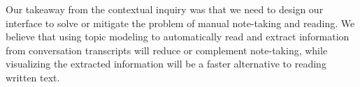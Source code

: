 Our takeaway from the contextual inquiry was that we need to design our interface to solve or mitigate the problem of manual note-taking and reading. We believe that using topic modeling to automatically read and extract information from conversation transcripts will reduce or complement note-taking, while visualizing the extracted information will be a faster alternative to reading written text.
